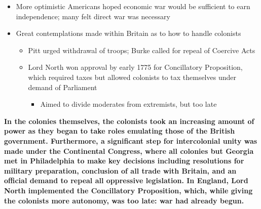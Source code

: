 \documentclass[a4paper]{article}
\begin{document}
{\begin{itemize}
\begin{enumerate}
            \item Rejected colonial union under Britain (like Albany Plan)
            \item Endorsed official statement of grievances for England
            \begin{itemize}
                \item Conceded Parliament's right to limit trade
                \item Requested that all oppressive legislation be repealed
            \end{itemize}
            \item Approved resolutions for military preparation against British troops in Boston
            \item Agreed to stop \textit{all trade} with Great Britain
            \begin{itemize}
                \item Continental Assocation formed to enforce agreements
            \end{itemize}
            \item Agreed to meet again in following spring
            \begin{itemize}
                \item Through meeting, had formed agreement to remain autonomy while declaring economic war on GB
            \end{itemize}
        \end{enumerate}
        \item More optimistic Americans hoped economic war would be sufficient to earn independence; many felt direct war was necessary
        \item Great contemplations made within Britain as to how to handle colonists
        \begin{itemize}
            \item Pitt urged withdrawal of troops; Burke called for repeal of Coercive Acts
            \item Lord North won approval by early 1775 for Concillatory Proposition, which required taxes but allowed colonists to tax themselves under demand of Parliament
            \begin{itemize}
                \item Aimed to divide moderates from extremists, but too late
            \end{itemize}
        \end{itemize}
    \end{itemize}
    \textbf{In the colonies themselves, the colonists took an increasing amount of power as they began to take roles emulating those of the British government. Furthermore, a significant step for intercolonial unity was made under the Continental Congress, where all colonies but Georgia met in Philadelphia to make key decisions including resolutions for military preparation, conclusion of all trade with Britain, and an official demand to repeal all oppressive legislation. In England, Lord North implemented the Concillatory Proposition, which, while giving the colonists more autonomy, was too late: war had already begun.}}
\end{document}
